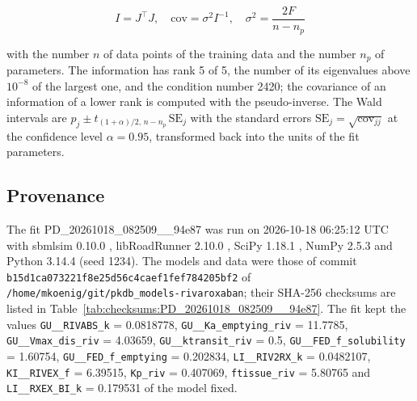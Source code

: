 \documentclass{article}
\begin{document}
\begin{equation}
I = J^\top J, \quad \mathrm{cov} = \sigma^2 I^{-1}, \quad \sigma^2 = \frac{2 F}{n - n_p}
\end{equation}

with the number $n$ of data points of the training data and the number $n_p$ of parameters. The information has rank 5 of 5, the number of its eigenvalues above $10^{-8}$ of the largest one, and the condition number 2420; the covariance of an information of a lower rank is computed with the pseudo-inverse. The Wald intervals are $\hat{p}_j \pm t_{(1+\alpha)/2,\, n-n_p}\, \mathrm{SE}_j$ with the standard errors $\mathrm{SE}_j = \sqrt{\mathrm{cov}_{jj}}$ at the confidence level $\alpha = 0.95$, transformed back into the units of the fit parameters.

\subsection{Provenance}

The fit PD\_20261018\_082509\_\_94e87 was run on 2026-10-18 06:25:12 UTC with sbmlsim 0.10.0 \cite{Koenig2026_sbmlsim}, libRoadRunner 2.10.0 \cite{Welsh2023}, SciPy 1.18.1 \cite{Virtanen2020}, NumPy 2.5.3 \cite{Harris2020} and Python 3.14.4 (seed 1234). The models and data were those of commit \texttt{b15d1ca073221f8e25d56c4caef1fef784205bf2} of \texttt{/home/mkoenig/git/pkdb\_models-rivaroxaban}; their SHA-256 checksums are listed in Table~\ref{tab:checksums:PD_20261018_082509__94e87}. The fit kept the values \texttt{GU\_\_RIVABS\_k} = 0.0818778, \texttt{GU\_\_Ka\_emptying\_riv} = 11.7785, \texttt{GU\_\_Vmax\_dis\_riv} = 4.03659, \texttt{GU\_\_ktransit\_riv} = 0.5, \texttt{GU\_\_FED\_f\_solubility} = 1.60754, \texttt{GU\_\_FED\_f\_emptying} = 0.202834, \texttt{LI\_\_RIV2RX\_k} = 0.0482107, \texttt{KI\_\_RIVEX\_f} = 6.39515, \texttt{Kp\_riv} = 0.407069, \texttt{ftissue\_riv} = 5.80765 and \texttt{LI\_\_RXEX\_BI\_k} = 0.179531 of the model fixed.
\end{document}
